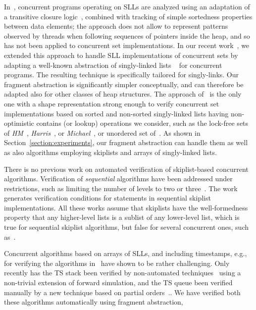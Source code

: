 In~\cite{AHHR:integrated:short}, concurrent programs operating on SLLs are analyzed
using an adaptation of a transitive closure logic~\cite{BiRa:vmcai06}, combined with
tracking of simple sortedness properties between data elements; the approach does
not allow to represent patterns observed by threads when following sequences of
pointers inside the heap, and so has not been applied to concurrent set
implementations.
In our recent work~\cite{Quy:sas16}, we extended this approach to handle SLL implementations
of concurrent sets by adapting a
well-known abstraction of singly-linked lists ~\cite{MYRS:Canonical} for concurrent programs.
The resulting technique is specifically tailored for singly-links.
Our fragment abstraction is significantly simpler conceptually, and can therefore be  adapted
also for other classes of heap structures.
The approach of~\cite{Quy:sas16} is the only one with a shape representation strong enough to
verify  concurrent set
implementations based on sorted and non-sorted
singly-linked lists having non-optimistic contains (or lookup) operations we consider, such as
the lock-free sets of {\it HM}~\cite{ArtOfMpP},
{\it Harris}~\cite{Harris:list}, or {\it Michael}~\cite{Michael:list},
or unordered set of~\cite{Zhang:unorderedlist}. As shown in
Section~\ref{section:experiments}, our fragment abstraction can handle them
as well as also algorithms employing skiplists and arrays of singly-linked lists.

There is no previous work on automated verification of skiplist-based concurrent algorithms.
Verification of {\em  sequential} algorithms have been addressed under restrictions, such as limiting the
number of levels to two or three~\cite{boxes13,Quy:atva13:journal}. The work~\cite{Sanchez:skiplists}
generates verification conditions for statements in sequential skiplist implementations. All these
works assume that skiplists have the well-formedness property that any higher-level lists is a
sublist of any lower-level list, which is true for sequential skiplist algorithms, but false for
several concurrent ones, such as~\cite{ArtOfMpP,Linden:opodis13}.



Concurrent algorithms based on arrays of SLLs, and including timestamps, e.g.,
for verifying the algorithms in~\cite{ts-stack} have shown to be rather challenging. Only
recently has the TS stack been verified by non-automated
techniques~\cite{BEEM:cav17} using a non-trivial extension of
forward simulation, and the TS queue been verified manually by a new technique
based on partial orders~\cite{Khyzha:esop17,singh:issre16}..
We have verified both these algorithms automatically using fragment abstraction,

